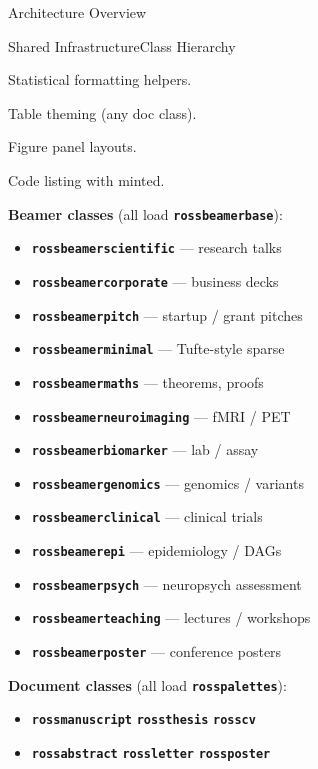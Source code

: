 \documentclass[palette=lancet]{rossbeamerscientific}
\newcommand{\cls}[1]{\texttt{\color{rbPrimary}\bfseries #1}}
\newcommand{\pkg}[1]{\texttt{\color{rbSecondary}\bfseries #1}}
\begin{document}
\begin{frame}{Architecture Overview}
\begin{comparison}{Shared Infrastructure}{Class Hierarchy}
\begin{description}[leftmargin=0pt]
    \item[\pkg{rossstats.sty}] Statistical formatting helpers.
    \item[\pkg{rosstables.sty}] Table theming (any doc class).
    \item[\pkg{rossfigures.sty}] Figure panel layouts.
    \item[\pkg{rosscode.sty}] Code listing with minted.
  \end{description}
\comparisondivide
  \textbf{Beamer classes} (all load \pkg{rossbeamerbase}):
  \begin{itemize}\setlength\itemsep{1pt}
    \item \cls{rossbeamerscientific} --- research talks
    \item \cls{rossbeamercorporate} --- business decks
    \item \cls{rossbeamerpitch} --- startup / grant pitches
    \item \cls{rossbeamerminimal} --- Tufte-style sparse
    \item \cls{rossbeamermaths} --- theorems, proofs
    \item \cls{rossbeamerneuroimaging} --- fMRI / PET
    \item \cls{rossbeamerbiomarker} --- lab / assay
    \item \cls{rossbeamergenomics} --- genomics / variants
    \item \cls{rossbeamerclinical} --- clinical trials
    \item \cls{rossbeamerepi} --- epidemiology / DAGs
    \item \cls{rossbeamerpsych} --- neuropsych assessment
    \item \cls{rossbeamerteaching} --- lectures / workshops
    \item \cls{rossbeamerposter} --- conference posters
  \end{itemize}
  \vskip4pt
  \textbf{Document classes} (all load \pkg{rosspalettes}):
  \begin{itemize}\setlength\itemsep{1pt}
    \item \cls{rossmanuscript} \cls{rossthesis} \cls{rosscv}
    \item \cls{rossabstract} \cls{rossletter} \cls{rossposter}
  \end{itemize}
\end{comparison}
\end{frame}
\end{document}

